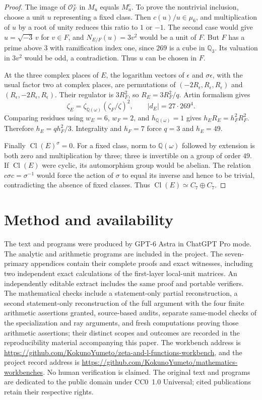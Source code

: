 \documentclass[11pt]{article}
\theoremstyle{remark}\newtheorem{remark}[theorem]{Remark}
\newcommand{\workbenchurl}{https://github.com/KokunoYumeto/zeta-and-l-functions-workbench}
\newcommand{\recordurl}{https://github.com/KokunoYumeto/mathematics-workbenches}
\begin{document}
\begin{proof}
The image of $\mathcal O_F^\times$ in $M_u$ equals $M_u^c$.
To prove the nontrivial inclusion, choose a unit $u$ representing a fixed class.
Then $c(u)/u\in\mu_6$, and multiplication of $u$ by a root of unity reduces this ratio to $1$ or $-1$.
The second case would give $u=\sqrt{-3}\,v$ for $v\in F$, and
$N_{E/F}(u)=3v^2$ would be a unit of $F$.
But $F$ has a prime above $3$ with ramification index one, since $269$ is a cube in $\mathbb Q_3$.
Its valuation in $3v^2$ would be odd, a contradiction.
Thus $u$ can be chosen in $F$.

At the three complex places of $E$, the logarithm vectors of $\epsilon$ and $\sigma\epsilon$, with the usual factor two at complex places, are permutations of
$(-2R_\epsilon,R_\epsilon,R_\epsilon)$ and
$(R_\epsilon,-2R_\epsilon,R_\epsilon)$.
Their regulator is $3R_F^2$, so
$R_E=3R_F^2/q$.
Artin formalism gives
\[
 \zeta_E=\zeta_{\mathbb Q(\omega)}(\zeta_F/\zeta)^2,
 \qquad |d_E|=27\cdot269^4.
\]
Comparing residues using $w_E=6$, $w_F=2$, and $h_{\mathbb Q(\omega)}=1$ gives
$h_ER_E=h_F^2R_F^2$.
Therefore $h_E=qh_F^2/3$. Integrality and $h_F=7$ force $q=3$ and $h_E=49$.

Finally $\operatorname{Cl}(E)^\sigma=0$.
For a fixed class, norm to $\mathbb Q(\omega)$ followed by extension is both zero and multiplication by three; three is invertible on a group of order $49$.
If $\operatorname{Cl}(E)$ were cyclic, its automorphism group would be abelian.
The relation $c\sigma c=\sigma^{-1}$ would force the action of $\sigma$ to equal its inverse and hence to be trivial, contradicting the absence of fixed classes.
Thus $\operatorname{Cl}(E)\simeq C_7\oplus C_7$.
\end{proof}




\section*{Method and availability}
The text and programs were produced by GPT-6 Astra in ChatGPT Pro mode.
The analytic and arithmetic programs are included in the project.
The seven-primary appendices contain their complete proofs and exact witnesses, including two independent exact calculations of the first-layer local-unit matrices.
An independently editable extract includes the same proof and portable verifiers.
The mathematical checks include a statement-only partial reconstruction, a second statement-only reconstruction of the full argument with the four finite arithmetic assertions granted, source-based audits, separate same-model checks of the specialization and ray arguments, and fresh computations proving those arithmetic assertions; their distinct scopes and outcomes are recorded in the reproducibility material accompanying this paper.
The workbench address is \expandafter\url\expandafter{\workbenchurl}, and the project record address is \expandafter\url\expandafter{\recordurl}.
No human verification is claimed.
The original text and programs are dedicated to the public domain under CC0~1.0 Universal; cited publications retain their respective rights.
\end{document}
